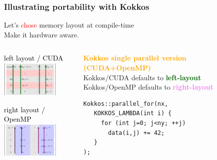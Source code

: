
\begin{frame}[fragile=singleslide]
  \frametitle{Illustrating portability with Kokkos}

  \begin{center}
    {\large Let's \textcolor{red}{chose} memory layout at compile-time\\
    Make it hardware aware.}
  \end{center}

  \begin{columns}
    \begin{column}{0.45\textwidth}
      \begin{center}
        \textcolor{black}{\large left layout / CUDA}\\
        \includegraphics[width=2.8cm]{tikz/row-major-cuda}

        \textcolor{black}{\large right layout / OpenMP}\\
        \includegraphics[width=2.8cm]{tikz/col-major-kokkos-openmp}

      \end{center}
    \end{column}
    \begin{column}{0.45\textwidth}
      \begin{center}
        \textcolor{orange}{\bf Kokkos single parallel version (CUDA+OpenMP)}\\
        {
          \scriptsize
          Kokkos/CUDA defaults to \textcolor{darkgreen}{\bf left-layout}\\
          Kokkos/OpenMP defaults to \textcolor{violet}{\bf right-layout}
        }
      \end{center}
      \begin{verbatim}
Kokkos::parallel_for(nx,
   KOKKOS_LAMBDA(int i) {
     for (int j=0; j<ny; ++j)
       data(i,j) += 42;
   }
);
      \end{verbatim}
    \end{column}
    \hfill
  \end{columns}
\end{frame}

